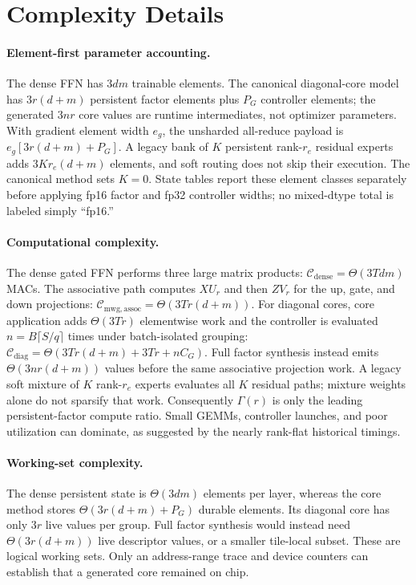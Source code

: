\section{Complexity Details}
\label{app:complexity}

\paragraph{Element-first parameter accounting.}
The dense FFN has $3dm$ trainable elements.  The canonical diagonal-core model
has $3r(d+m)$ persistent factor elements plus $P_G$ controller elements; the
generated $3nr$ core values are runtime intermediates, not optimizer
parameters.  With gradient element width $e_g$, the unsharded all-reduce
payload is $e_g[3r(d+m)+P_G]$.  A legacy bank of $K$ persistent rank-$r_e$
residual experts adds $3Kr_e(d+m)$ elements, and soft routing does not skip
their execution.  The canonical method sets $K=0$.  State tables report these
element classes separately before applying fp16 factor and fp32 controller
widths; no mixed-dtype total is labeled simply ``fp16.''

\paragraph{Computational complexity.}
The dense gated FFN performs three large matrix products:
$\mathcal{C}_{\mathrm{dense}} = \Theta(3Tdm)$ MACs. The associative
\mwg{} path computes $XU_r$ and then $ZV_r$ for the up, gate, and down
projections: $\mathcal{C}_{\mathrm{mwg,assoc}} = \Theta(3Tr(d+m))$. For
diagonal cores, core application adds $\Theta(3Tr)$ elementwise work and the
controller is evaluated $n=B\lceil S/q\rceil$ times under batch-isolated
grouping: $\mathcal{C}_{\mathrm{diag}}=\Theta(3Tr(d+m)+3Tr+nC_G)$. Full
factor synthesis instead emits $\Theta(3nr(d+m))$ values before the same
associative projection work. A legacy soft mixture of $K$ rank-$r_e$ experts
evaluates all $K$ residual paths; mixture weights alone do not sparsify that
work. Consequently $\Gamma(r)$ is only the leading persistent-factor compute
ratio. Small GEMMs, controller launches, and poor utilization can dominate,
as suggested by the nearly rank-flat historical timings.

\paragraph{Working-set complexity.}
The dense persistent state is $\Theta(3dm)$ elements per layer, whereas the
core method stores $\Theta(3r(d+m)+P_G)$ durable elements. Its diagonal core
has only $3r$ live values per group. Full factor synthesis would instead need
$\Theta(3r(d+m))$ live descriptor values, or a smaller tile-local subset.
These are logical working sets. Only an address-range trace and device
counters can establish that a generated core remained on chip.

